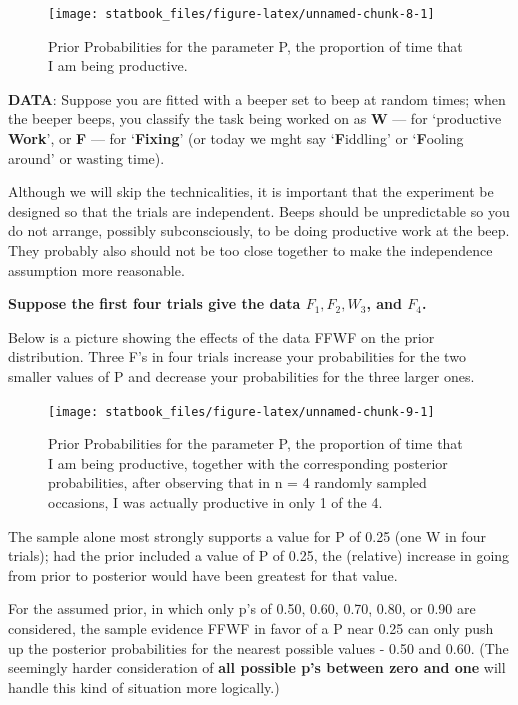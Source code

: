 \documentclass[]{book}
\begin{document}
\begin{figure}

{\centering \texttt{[image: statbook\_files/figure-latex/unnamed-chunk-8-1]} 

}

\caption{Prior Probabilities for the parameter P, the proportion of time that I am being productive.}\label{fig:unnamed-chunk-8}
\end{figure}

\textbf{DATA}: Suppose you are fitted with a beeper set to beep at random times; when the beeper beeps, you classify the task being worked on as \textbf{W} --- for `productive \textbf{Work}', or \textbf{F} --- for `\textbf{Fixing}' (or today we mght say `\textbf{F}iddling' or `\textbf{F}ooling around' or wasting time).

Although we will skip the technicalities, it is important that the experiment be designed so that the trials are independent. Beeps should be unpredictable so you do not arrange, possibly subconsciously, to be doing productive work at the beep. They probably also should not be too close together to make the independence assumption more reasonable.

\textbf{Suppose the first four trials give the data \(F_1, F_2, W_3\), and \(F_4\).}

Below is a picture showing the effects of the data FFWF on the prior distribution. Three F's in four trials increase your probabilities for the two smaller values of P and decrease your probabilities for the three larger ones.

\begin{figure}

{\centering \texttt{[image: statbook\_files/figure-latex/unnamed-chunk-9-1]} 

}

\caption{Prior Probabilities for the parameter P, the proportion of time that I am being productive, together with the corresponding posterior probabilities, after observing that in n = 4 randomly sampled occasions, I was actually productive in only 1 of the 4.}\label{fig:unnamed-chunk-9}
\end{figure}

The sample alone most strongly supports a value for P of 0.25 (one W in four trials); had the prior included a value of P of 0.25, the (relative) increase in going from prior to posterior would have been greatest for that value.

For the assumed prior, in which only p's of 0.50, 0.60, 0.70, 0.80, or 0.90 are considered, the sample evidence FFWF in favor of a P near 0.25 can only push up the posterior probabilities for the nearest possible values - 0.50 and 0.60. (The seemingly harder consideration of \textbf{all possible p's between zero and one} will handle this kind of situation more logically.)
\end{document}
